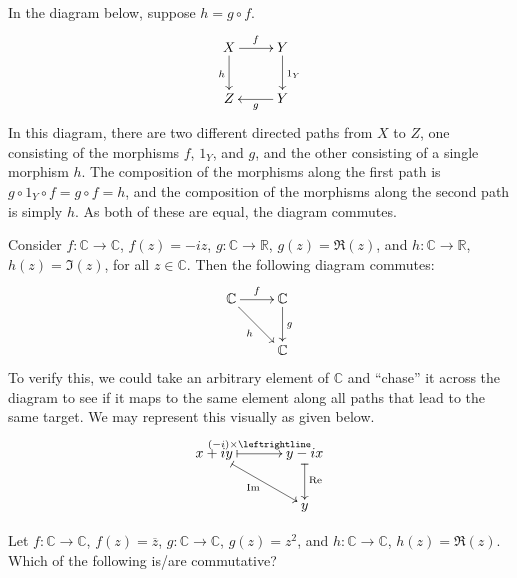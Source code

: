 \begin{Example} In the diagram below, suppose $h = g \circ f$.
\begin{equation*}
\xymatrix{
X \ar[r]^f \ar[d]_h & Y \ar[d]^{1_Y} \\
Z & Y \ar[l]^g
}
\end{equation*}
In this diagram, there are two different directed paths from $X$ to $Z$, one consisting of the morphisms $f$, $1_Y$, and $g$, and the other consisting of a single morphism $h$. The composition of the morphisms along the first path is $g \circ 1_Y \circ f = g \circ f = h$, and the composition of the morphisms along the second path is simply $h$. As both of these are equal, the diagram commutes.
\end{Example}

\begin{Example}
Consider $f \colon \mathbb C \to \mathbb C$, $f(z) = -iz$, $g \colon \mathbb C \to \mathbb R$, $g(z) = \Re(z)$, and $h \colon \mathbb C \to \mathbb R$, $h(z) = \Im(z)$, for all $z \in \mathbb C$. Then the following diagram commutes:
\begin{equation*}
\xymatrix{
\mathbb C \ar[r]^f \ar[rd]_h & \mathbb C \ar[d]^g \\
& \mathbb C
}
\end{equation*}
To verify this, we could take an arbitrary element of $\mathbb C$ and ``chase'' it across the diagram to see if it maps to the same element along all paths that lead to the same target. We may represent this visually as given below.
\begin{equation*}
\xymatrix@C=3.2em{
x + iy \ar@{|->}[r]^{(-i) \times \leftrightline} \ar@{|->}[rd]_{\Im} & y - ix \ar@{|->}[d]^{\Re} \\
& y
}
\end{equation*}
\end{Example}

\begin{Exercise}
Let $f \colon \mathbb C \to \mathbb C$, $f(z) = \overline z$, $g \colon \mathbb C \to \mathbb C$, $g(z) = z^2$, and $h \colon \mathbb C \to \mathbb C$, $h(z) = \Re(z)$. Which of the following is/are commutative?
\begin{figure}[H]
\centering
{} \qquad
{}
\end{figure}
\end{Exercise}

